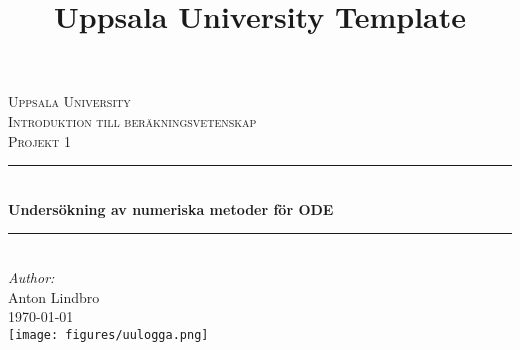 \documentclass[12pt]{article}
\title{Uppsala University Template}
\begin{document}
\begin{titlepage}

\newcommand{\HRule}{\rule{\linewidth}{0.5mm}} %

\begin{center}
\textsc{\LARGE Uppsala University}\\[1.5cm] %
\textsc{\Large Introduktion till beräkningsvetenskap}\\[0.5cm] %
\textsc{\large Projekt 1}\\[0.5cm] %

\HRule \\[0.4cm]
{ \huge \bfseries Undersökning av numeriska metoder för ODE}\\[0.4cm] %
\HRule \\[1.5cm]
 

\large\emph{Author:}\\ Anton Lindbro\\[1.0cm]%




{\large \today}\\[1cm] %

\texttt{[image: figures/uulogga.png]}\\%
\end{center}
\end{titlepage}
\end{document}
